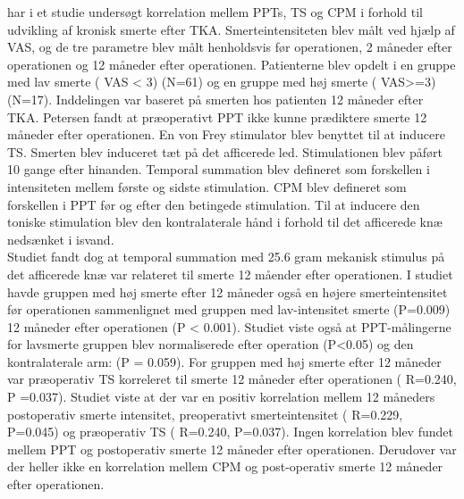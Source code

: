  har i et studie undersøgt korrelation mellem PPTs, TS og CPM i forhold til udvikling af kronisk smerte efter TKA. Smerteintensiteten blev målt ved hjælp af VAS, og de tre parametre blev målt henholdsvis før operationen, 2 måneder efter operationen og 12 måneder efter operationen. Patienterne blev opdelt i en gruppe med lav smerte ( VAS < 3) (N=61) og en  gruppe med høj smerte ( VAS>=3) (N=17). Inddelingen var baseret på smerten hos patienten 12 måneder efter TKA. Petersen fandt at præoperativt PPT ikke kunne prædiktere smerte 12 måneder efter operationen. En von Frey stimulator blev benyttet til at inducere TS. Smerten blev induceret tæt på det afficerede led. Stimulationen blev påført 10 gange efter hinanden. Temporal summation blev defineret som forskellen i intensiteten mellem første og sidste stimulation. CPM blev defineret som forskellen i PPT før og efter den betingede stimulation. Til at inducere den toniske stimulation blev den kontralaterale hånd i forhold til det afficerede knæ nedsænket i isvand.\\
Studiet fandt dog at temporal summation med 25.6 gram mekanisk stimulus på det afficerede knæ var relateret til smerte 12 måender efter operationen. I studiet havde gruppen med høj smerte efter 12 måneder også en højere smerteintensitet før operationen sammenlignet med gruppen med lav-intensitet smerte (P=0.009) 12 måneder efter operationen (P < 0.001). Studiet viste også at PPT-målingerne for lavsmerte gruppen blev normaliserede efter operation (P<0.05) og den kontralaterale arm: (P = 0.059). For gruppen med høj smerte efter 12 måneder var præoperativ TS korreleret til smerte 12 måneder efter operationen ( R=0.240, P =0.037).
Studiet viste at der var en positiv korrelation mellem 12 måneders postoperativ smerte intensitet, preoperativt smerteintensitet ( R=0.229, P=0.045) og præoperativ TS ( R=0.240, P=0.037). Ingen korrelation blev fundet mellem PPT og postoperativ smerte 12 måneder efter operationen. Derudover var der heller ikke en korrelation mellem CPM og post-operativ smerte 12 måneder efter operationen.


